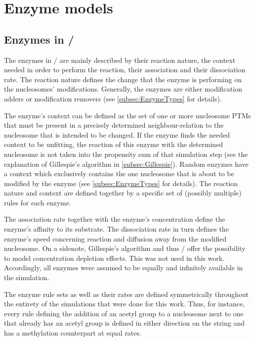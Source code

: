     \section{Enzyme models}
        \subsection{Enzymes in \ed/}
            The enzymes in \ed/ are mainly described by their reaction nature, the context needed in order to perform the reaction, their association and their dissociation rate. The reaction nature defines the change that the enzyme is performing on the nucleosomes' modifications. Generally, the enzymes are either modification adders or modification removers (see \ref{subsec:EnzymeTypes} for details).

            The enzyme's context can be defined as the set of one or more nucleosome PTMs that must be present in a precisely determined neighbour-relation to the nucleosome that is intended to be changed. If the enzyme finds the needed context to be unfitting, the reaction of this enzyme with the determined nucleosome is not taken into the propensity sum of that simulation step (see the explanation of Gillespie's algorithm in \ref{subsec:Gillespie}). Random enzymes have a context which exclusively contains the one nucleosome that is about to be modified by the enzyme (see \ref{subsec:EnzymeTypes} for details). The reaction nature and context are defined together by a specific set of (possibly multiple) rules for each enzyme.

            The association rate together with the enzyme's concentration define the enzyme's affinity to its substrate. The dissociation rate in turn defines the enzyme's speed concerning reaction and diffusion away from the modified nucleosome. On a sidenote, Gillespie's algorithm and thus \ed/ offer the possibility to model concentration depletion effects. This was not used in this work. Accordingly, all enzymes were assumed to be equally and infinitely available in the simulation.

            The enzyme rule sets as well as their rates are defined symmetrically throughout the entirety of the simulations that were done for this work. Thus, for instance, every rule defining the addition of an acetyl group to a nucleosome next to one that already has an acetyl group is defined in either direction on the string and has a methylation counterpart at equal rates.
